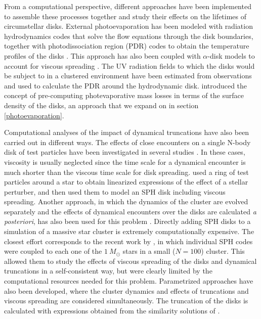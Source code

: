 \documentclass[fleqn,usenatbib]{mnras}
\begin{document}
From a computational perspective, different approaches have been implemented to assemble these processes together and study their effects on the lifetimes of circumstellar disks. External photoevaporation has been modeled with radiation hydrodynamics codes that solve the flow equations through the disk boundaries, together with photodissociation region (PDR) codes to obtain the temperature profiles of the disks \citep[e.g.][]{haworth2016,facchini2016}. This approach has also been coupled with $\alpha$-disk models to account for viscous spreading \citep[e.g.][]{adams2004,anderson2013,gorti2015,rosotti2017}. The UV radiation fields to which the disks would be subject to in a clustered environment have been estimated from observations and used to calculate the PDR around the hydrodynamic disk. \citet{haworth2018a} introduced the concept of pre-computing photevaporative mass losses in terms of the surface density of the disks, an approach that we expand on in section \ref{photoevaporation}. 

Computational analyses of the impact of dynamical truncations have also been carried out in different ways. The effects of close encounters on a single N-body disk of test particles have been investigated in several studies \citep[e.g.][]{breslau2014,jilkova2016,bhandare2016,pfalzner2018}. In these cases, viscosity is usually neglected since the time scale for a dynamical encounter is much shorter than the viscous time scale for disk spreading. \citet{winter2018,winter2018a} used a ring of test particles around a star to obtain linearized expressions of the effect of a stellar perturber, and then used them to model an SPH disk including viscous spreading. Another approach, in which the dynamics of the cluster are evolved separately and the effects of dynamical encounters over the disks are calculated \textit{a posteriori}, has also been used for this problem \citep[e.g.][]{olczak2006,olczak2010,malmberg2011,steinhausen2014,vincke2015,vincke2016,vincke2018}. Directly adding SPH disks to a simulation of a massive star cluster is extremely computationally expensive. The closest effort corresponds to the recent work by \citet{rosotti2014}, in which individual SPH codes were coupled to each one of the $\SI{1}{M_\odot}$ stars in a small ($N=100$) cluster. This allowed them to study the effects of viscous spreading of the disks and dynamical truncations in a self-consistent way, but were clearly limited by the computational resources needed for this problem. Parametrized approaches have also been developed, where the cluster dynamics and effects of truncations \citep{portegieszwart2016} and viscous spreading \citep{concha-ramirez2019} are considered simultaneously. The truncation of the disks is calculated with expressions obtained from the similarity solutions of \citet{lynden-bell1974}.
\end{document}
